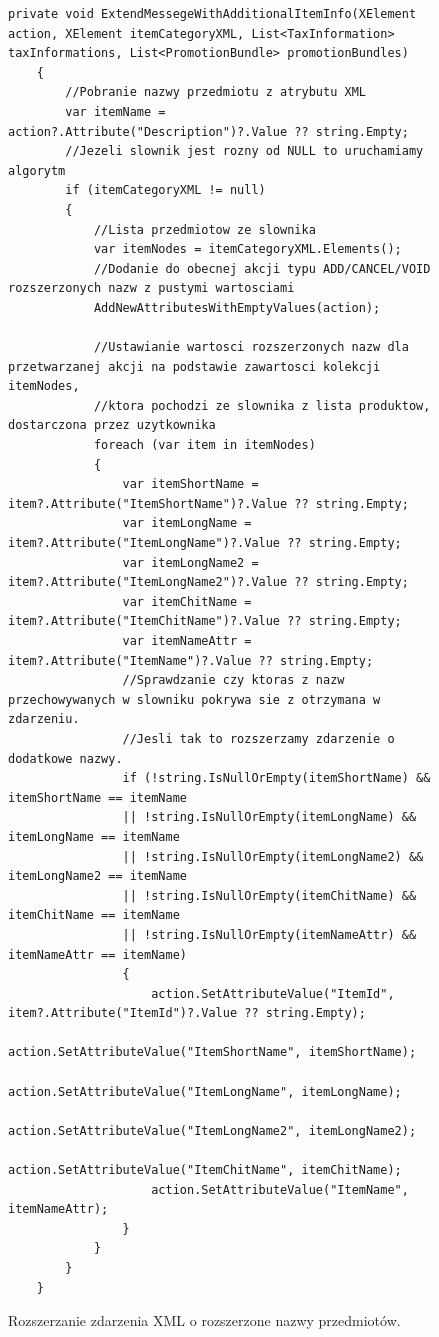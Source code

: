 \documentclass[a4paper]{book}
\begin{document}
\begin{figure}[t]
	\begin{lstlisting}[frame=single, breaklines=true]
	private void ExtendMessegeWithAdditionalItemInfo(XElement action, XElement itemCategoryXML, List<TaxInformation> taxInformations, List<PromotionBundle> promotionBundles)
	{
		//Pobranie nazwy przedmiotu z atrybutu XML
		var itemName = action?.Attribute("Description")?.Value ?? string.Empty;
		//Jezeli slownik jest rozny od NULL to uruchamiamy algorytm
		if (itemCategoryXML != null)
		{
			//Lista przedmiotow ze slownika
			var itemNodes = itemCategoryXML.Elements();
			//Dodanie do obecnej akcji typu ADD/CANCEL/VOID rozszerzonych nazw z pustymi wartosciami
			AddNewAttributesWithEmptyValues(action);
			
			//Ustawianie wartosci rozszerzonych nazw dla przetwarzanej akcji na podstawie zawartosci kolekcji itemNodes, 
			//ktora pochodzi ze slownika z lista produktow, dostarczona przez uzytkownika
			foreach (var item in itemNodes)
			{
				var itemShortName = item?.Attribute("ItemShortName")?.Value ?? string.Empty;
				var itemLongName = item?.Attribute("ItemLongName")?.Value ?? string.Empty;
				var itemLongName2 = item?.Attribute("ItemLongName2")?.Value ?? string.Empty;
				var itemChitName = item?.Attribute("ItemChitName")?.Value ?? string.Empty;
				var itemNameAttr = item?.Attribute("ItemName")?.Value ?? string.Empty;
				//Sprawdzanie czy ktoras z nazw przechowywanych w slowniku pokrywa sie z otrzymana w zdarzeniu.
				//Jesli tak to rozszerzamy zdarzenie o dodatkowe nazwy.	
				if (!string.IsNullOrEmpty(itemShortName) && itemShortName == itemName
				|| !string.IsNullOrEmpty(itemLongName) && itemLongName == itemName
				|| !string.IsNullOrEmpty(itemLongName2) && itemLongName2 == itemName
				|| !string.IsNullOrEmpty(itemChitName) && itemChitName == itemName
				|| !string.IsNullOrEmpty(itemNameAttr) && itemNameAttr == itemName)
				{
					action.SetAttributeValue("ItemId", item?.Attribute("ItemId")?.Value ?? string.Empty);
					action.SetAttributeValue("ItemShortName", itemShortName);
					action.SetAttributeValue("ItemLongName", itemLongName);
					action.SetAttributeValue("ItemLongName2", itemLongName2);
					action.SetAttributeValue("ItemChitName", itemChitName);
					action.SetAttributeValue("ItemName", itemNameAttr);
				}
			}
		}
	}
	\end{lstlisting}
	\caption{Rozszerzanie zdarzenia XML o rozszerzone nazwy przedmiotów.}
	\label{lst:rozszerzanieXML}
\end{figure}
\end{document}
